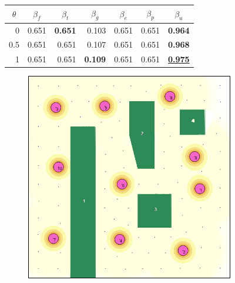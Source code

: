 \documentclass[letterpaper, 10 pt, conference]{ieeeconf}
\begin{document}
\begin{figure}[!h]
\begin{minipage}{\columnwidth}
{\begin{tabular}{|rrrrrrr|}
\multicolumn{1}{|c|}{\textbf{$\theta$}} & \multicolumn{1}{c|}{\textbf{$\beta_f$}} & \multicolumn{1}{c|}{\textbf{$\beta_t$}} & \multicolumn{1}{c|}{\textbf{$\beta_g$}} & \multicolumn{1}{c|}{\textbf{$\beta_e$}} & \multicolumn{1}{c|}{\textbf{$\beta_p$}} & \multicolumn{1}{c|}{\textbf{$\beta_u$}} \\ \hline
\multicolumn{1}{|r|}{0} & \multicolumn{1}{r|}{0.651} & \multicolumn{1}{r|}{\textbf{0.651}} & \multicolumn{1}{r|}{0.103} & \multicolumn{1}{r|}{0.651} & \multicolumn{1}{r|}{0.651} & \textbf{0.964} \\ \hline
\multicolumn{1}{|r|}{0.5} & \multicolumn{1}{r|}{0.651} & \multicolumn{1}{r|}{0.651} & \multicolumn{1}{r|}{0.107} & \multicolumn{1}{r|}{0.651} & \multicolumn{1}{r|}{0.651} & \textbf{0.968} \\ \hline
\multicolumn{1}{|r|}{1} & \multicolumn{1}{r|}{0.651} & \multicolumn{1}{r|}{0.651} & \multicolumn{1}{r|}{\textbf{0.109}} & \multicolumn{1}{r|}{0.651} & \multicolumn{1}{r|}{0.651} & {\ul \textbf{0.975}} \\ \hline
\end{tabular}}
\vspace{3mm}
\end{minipage}
\centering
\begin{subfigure}[t]{0.3\columnwidth}
    \centering
    \includegraphics[width=\columnwidth]{Figures/GeneralDecay05.png}

\end{subfigure}
\end{figure}
\end{document}
